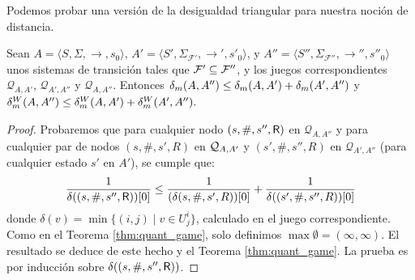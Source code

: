 Podemos probar una versión de la desigualdad triangular para nuestra noción de distancia.
%
\begin{theorem} \label{thm:triang_ineq}
Sean $A = \langle S, \Sigma, \rightarrow, s_0 \rangle$, $A' = \langle S', \Sigma_{\mathcal{F'}}, \rightarrow', s'_0 \rangle$,  y  $A'' = \langle S'', \Sigma_{\mathcal{F''}},\rightarrow'', s''_0 \rangle$ unos sistemas de transición tales que $\Faults' \subseteq \Faults''$, y los juegos correspondientes $\mathcal{Q}_{A,A'}$, $\mathcal{Q}_{A',A''}$ y $\mathcal{Q}_{A,A''}$.
Entonces $\DeltaMask(A,A'') \leq \DeltaMask(A,A') + \DeltaMask(A', A'')$ y $\DeltaMask^W(A,A'') \leq \DeltaMask^W(A,A') + \DeltaMask^W(A', A'').$
\end{theorem}
\begin{proof} 
Probaremos que para cualquier nodo $(s,\#,s'',\Refuter)$ en $\mathcal{Q}_{A,A''}$ y para cualquier par de nodos
$(s,\#, s', R)$ en $\QMStrGame$ y $(s',\#,s'', R)$ en $\mathcal{Q}_{{A'},A''}$ (para cualquier estado $s'$ en $A'$), se cumple que:
\[
\frac{1}{\pr{0}{\delta((s,\#, s'', \Refuter))}} \leq \frac{1}{\pr{0}{(\delta(s,\#, s', R))}} + \frac{1}{\pr{0}{\delta((s',\#, s'', R))}}
\] 
donde $\delta(v) = \min \{(i,j) \mid v \in U^i_j\}$, calculado en el juego correspondiente. 
Como en el Teorema \ref{thm:quant_game}, solo definimos $\max \emptyset = (\infty, \infty)$. 
El resultado se deduce de este hecho y el Teorema \ref{thm:quant_game}. La prueba es por inducción sobre $\delta((s,\#, s'', \Refuter))$.


\end{proof}

